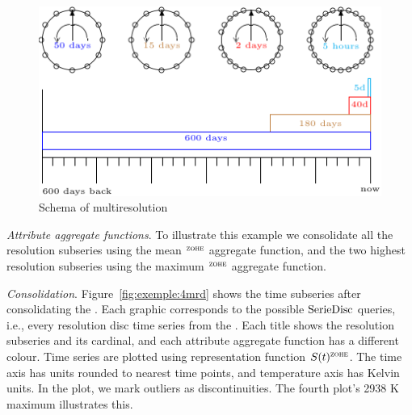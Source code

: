 \begin{figure}[tp]
  \centering
  \setlength{\unitlength}{1.3mm}
  \includegraphics{fig_exemple_window.pdf}
  \caption{Schema of multiresolution}
  \label{fig:exemple:window}
\end{figure}

\emph{Attribute aggregate functions}.  To illustrate this example we
consolidate all the resolution subseries using the mean $^\zohe{}$
aggregate function, and the two highest resolution subseries using the
maximum $^\zohe{}$ aggregate function.

\emph{Consolidation}. Figure~\ref{fig:exemple:4mrd} shows the time
subseries after consolidating the .  Each graphic
corresponds to the possible $\operatorname{SerieDisc}$ queries, i.e., every
resolution disc time series from the . Each title shows
the resolution subseries and its cardinal, and each attribute
aggregate function has a different colour.
%
Time series are plotted using \zohe{} representation function
$S(t)^\zohe{}$. The time axis has  units rounded to nearest
time points, and temperature axis has Kelvin units. In the plot, we
mark outliers as discontinuities.  The fourth plot's 2938 K maximum
illustrates this.

